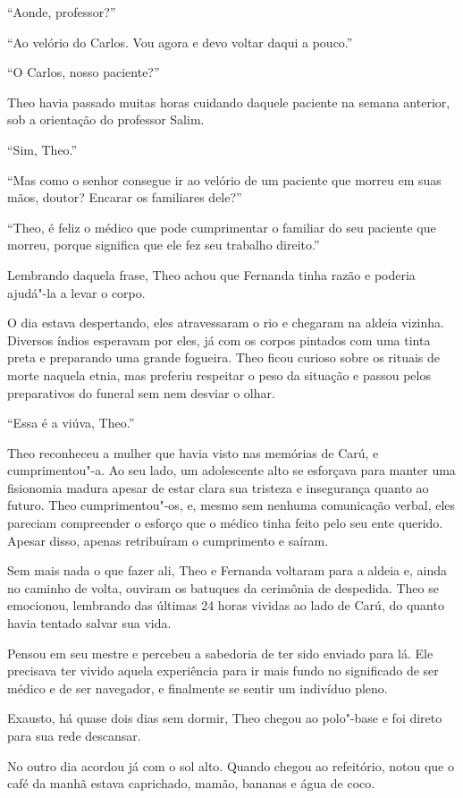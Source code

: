 ``Aonde, professor?''

``Ao velório do Carlos. Vou agora e devo voltar daqui a pouco.''

``O Carlos, nosso paciente?''

Theo havia passado muitas horas cuidando daquele paciente na semana
anterior, sob a orientação do professor Salim.

``Sim, Theo.''

``Mas como o senhor consegue ir ao velório de um paciente que morreu em
suas mãos, doutor? Encarar os familiares dele?''

``Theo, é feliz o médico que pode cumprimentar o familiar do seu
paciente que morreu, porque significa que ele fez seu trabalho
direito.''

Lembrando daquela frase, Theo achou que Fernanda tinha razão e poderia
ajudá"-la a levar o corpo.

O dia estava despertando, eles atravessaram o rio e chegaram na aldeia
vizinha. Diversos índios esperavam por eles, já com os corpos pintados
com uma tinta preta e preparando uma grande fogueira. Theo ficou curioso
sobre os rituais de morte naquela etnia, mas preferiu respeitar o peso
da situação e passou pelos preparativos do funeral sem nem desviar o
olhar.

``Essa é a viúva, Theo.''

Theo reconheceu a mulher que havia visto nas memórias de Carú, e
cumprimentou"-a. Ao seu lado, um adolescente alto se esforçava para
manter uma fisionomia madura apesar de estar clara sua tristeza e
insegurança quanto ao futuro. Theo cumprimentou"-os, e, mesmo sem nenhuma
comunicação verbal, eles pareciam compreender o esforço que o médico
tinha feito pelo seu ente querido. Apesar disso, apenas
retribuíram o cumprimento e saíram.

Sem mais nada o que fazer ali, Theo e Fernanda voltaram para a aldeia e,
ainda no caminho de volta, ouviram os batuques da cerimônia de
despedida. Theo se emocionou, lembrando das últimas 24 horas vividas ao
lado de Carú, do quanto havia tentado salvar sua vida.

Pensou em seu mestre e percebeu a sabedoria de ter sido enviado para lá.
Ele precisava ter vivido aquela experiência para ir mais fundo no
significado de ser médico e de ser navegador, e finalmente se sentir um
indivíduo pleno.

Exausto, há quase dois dias sem dormir, Theo chegou ao polo"-base e foi
direto para sua rede descansar.

No outro dia acordou já com o sol alto. Quando chegou ao refeitório,
notou que o café da manhã estava caprichado, mamão, bananas e água de
coco.

